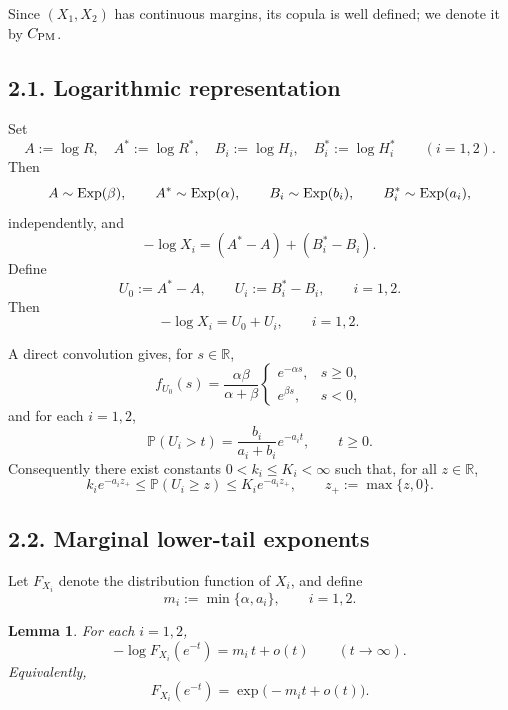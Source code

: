 \documentclass[11pt]{article}
\newtheorem{lemma}[theorem]{Lemma}
\begin{document}
Since $(X_1,X_2)$ has continuous margins, its copula is well defined; we denote it by $C_{\rm PM}$.

\subsection*{2.1. Logarithmic representation}

Set
\[
A:=\log R,\quad A^*:=\log R^*,\quad
B_i:=\log H_i,\quad B_i^*:=\log H_i^* \qquad (i=1,2).
\]
Then
\[
A\sim{\rm Exp}(\beta),\qquad A^*\sim{\rm Exp}(\alpha),
\qquad
B_i\sim{\rm Exp}(b_i),\qquad B_i^*\sim{\rm Exp}(a_i),
\]
independently, and
\[
-\log X_i = (A^*-A)+(B_i^*-B_i).
\]
Define
\[
U_0:=A^*-A,\qquad U_i:=B_i^*-B_i,\qquad i=1,2.
\]
Then
\[
-\log X_i = U_0+U_i,\qquad i=1,2.
\]

A direct convolution gives, for $s\in\mathbb R$,
\[
f_{U_0}(s)
=
\frac{\alpha\beta}{\alpha+\beta}
\begin{cases}
e^{-\alpha s}, & s\ge 0,\\[1mm]
e^{\beta s}, & s<0,
\end{cases}
\]
and for each $i=1,2$,
\[
\mathbb P(U_i>t)=\frac{b_i}{a_i+b_i}e^{-a_i t},
\qquad t\ge 0.
\]
Consequently there exist constants $0<k_i\le K_i<\infty$ such that, for all $z\in\mathbb R$,
\begin{equation}\label{eq:Ui-two-sided-bounds}
k_i e^{-a_i z_+}
\le
\mathbb P(U_i\ge z)
\le
K_i e^{-a_i z_+},
\qquad z_+:=\max\{z,0\}.
\end{equation}

\subsection*{2.2. Marginal lower-tail exponents}

Let $F_{X_i}$ denote the distribution function of $X_i$, and define
\[
m_i:=\min\{\alpha,a_i\},\qquad i=1,2.
\]

\begin{lemma}\label{lem:marginal-log-tail}
For each $i=1,2$,
\[
-\log F_{X_i}(e^{-t}) = m_i\,t + o(t)
\qquad (t\to\infty).
\]
Equivalently,
\[
F_{X_i}(e^{-t}) = \exp\!\bigl(-m_i t + o(t)\bigr).
\]
\end{lemma}
\end{document}

